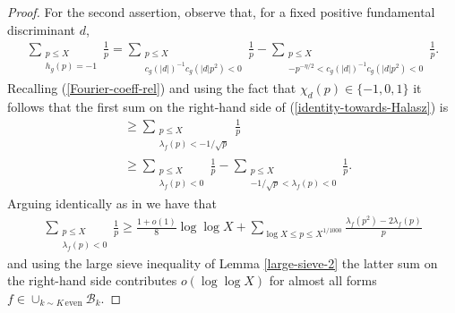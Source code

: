 \documentclass[10pt,a4paper]{amsart}
\begin{document}
\begin{proof}
For the second assertion, observe that, for a fixed positive fundamental discriminant $d$, 
\begin{align}\label{identity-towards-Halasz}
\sum_{\substack{p\leq X\\
h_g(p)=-1}}\frac1p=\sum_{\substack{p\leq X\\
c_g(|d|)^{-1}c_g(|d|p^2)<0}}\frac1p-\sum_{\substack{p\leq X\\
-p^{-\eta/2}<c_g(|d|)^{-1}c_g(|d|p^2)<0}}\frac 1p.
\end{align}
Recalling (\ref{Fourier-coeff-rel}) and using the fact that $\chi_d(p)\in\{-1,0,1\}$ it follows that the first sum on the right-hand side of (\ref{identity-towards-Halasz}) is
\begin{align*}
&\geq \sum_{\substack{p\leq X\\
\lambda_f(p)<-1/\sqrt p}}\frac1p \\
&\geq \sum_{\substack{p\leq X\\
\lambda_f(p)<0}}\frac1p-\sum_{\substack{p\leq X\\
-1/\sqrt p<\lambda_f(p)<0}}\frac1p.
\end{align*}
Arguing identically as in \cite[p. 1610]{Lester-Matomaki-Radziwill2018} we have that
\begin{align*}
\sum_{\substack{p\leq X\\
\lambda_f(p)<0}}\frac1p\geq\frac{1+o(1)}8\log\log X+\sum_{\log X\leq p\leq X^{1/1000}}\frac{\lambda_f(p^2)-2\lambda_f(p)}p
\end{align*} 
and using the large sieve inequality of Lemma \ref{large-sieve-2} the latter sum on the right-hand side contributes $o(\log\log X)$ for almost all forms $f\in\cup_{k\sim K\,\text{even}}\mathcal B_k$. 


\end{proof}
\end{document}
